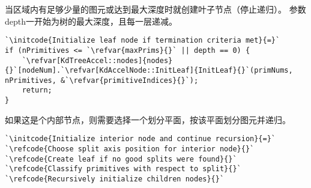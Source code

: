 当区域内有足够少量的图元或达到最大深度时就创建叶子节点（停止递归）。
参数{\ttfamily depth}一开始为树的最大深度，且每一层递减。
\begin{lstlisting}
`\initcode{Initialize leaf node if termination criteria met}{=}`
if (nPrimitives <= `\refvar{maxPrims}{}` || depth == 0) {
    `\refvar[KdTreeAccel::nodes]{nodes}{}`[nodeNum].`\refvar[KdAccelNode::InitLeaf]{InitLeaf}{}`(primNums, nPrimitives, &`\refvar{primitiveIndices}{}`);
    return;
}
\end{lstlisting}

如果这是个内部节点，则需要选择一个划分平面，按该平面划分图元并递归。
\begin{lstlisting}
`\initcode{Initialize interior node and continue recursion}{=}`
`\refcode{Choose split axis position for interior node}{}`
`\refcode{Create leaf if no good splits were found}{}`
`\refcode{Classify primitives with respect to split}{}`
`\refcode{Recursively initialize children nodes}{}`
\end{lstlisting}

